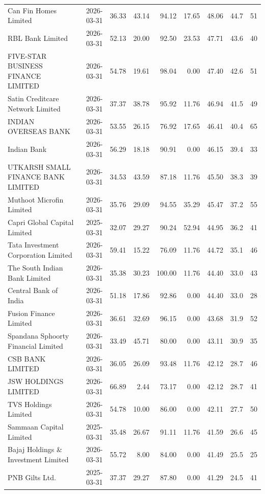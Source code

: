 {\begin{longtable}{@{}L{5.1cm}rrrrrrrr@{}}
Can Fin Homes Limited & 2026-03-31 & 36.33 & 43.14 & 94.12 & 17.65 & 48.06 & 44.7 & 51 \\
RBL Bank Limited & 2026-03-31 & 52.13 & 20.00 & 92.50 & 23.53 & 47.71 & 43.6 & 40 \\
FIVE-STAR BUSINESS FINANCE LIMITED & 2026-03-31 & 54.78 & 19.61 & 98.04 & 0.00 & 47.40 & 42.6 & 51 \\
Satin Creditcare Network Limited & 2026-03-31 & 37.37 & 38.78 & 95.92 & 11.76 & 46.94 & 41.5 & 49 \\
INDIAN OVERSEAS BANK & 2026-03-31 & 53.55 & 26.15 & 76.92 & 17.65 & 46.41 & 40.4 & 65 \\
Indian Bank & 2026-03-31 & 56.29 & 18.18 & 90.91 & 0.00 & 46.15 & 39.4 & 33 \\
UTKARSH SMALL FINANCE BANK LIMITED & 2026-03-31 & 34.53 & 43.59 & 87.18 & 11.76 & 45.50 & 38.3 & 39 \\
Muthoot Microfin Limited & 2026-03-31 & 35.76 & 29.09 & 94.55 & 35.29 & 45.47 & 37.2 & 55 \\
Capri Global Capital Limited & 2025-03-31 & 32.07 & 29.27 & 90.24 & 52.94 & 44.95 & 36.2 & 41 \\
Tata Investment Corporation Limited & 2026-03-31 & 59.41 & 15.22 & 76.09 & 11.76 & 44.72 & 35.1 & 46 \\
The South Indian Bank Limited & 2026-03-31 & 35.38 & 30.23 & 100.00 & 11.76 & 44.40 & 33.0 & 43 \\
Central Bank of India & 2026-03-31 & 51.18 & 17.86 & 92.86 & 0.00 & 44.40 & 33.0 & 28 \\
Fusion Finance Limited & 2026-03-31 & 36.61 & 32.69 & 96.15 & 0.00 & 43.68 & 31.9 & 52 \\
Spandana Sphoorty Financial Limited & 2026-03-31 & 33.49 & 45.71 & 80.00 & 0.00 & 43.11 & 30.9 & 35 \\
CSB BANK LIMITED & 2026-03-31 & 36.05 & 26.09 & 93.48 & 11.76 & 42.12 & 28.7 & 46 \\
JSW HOLDINGS LIMITED & 2026-03-31 & 66.89 & 2.44 & 73.17 & 0.00 & 42.12 & 28.7 & 41 \\
TVS Holdings Limited & 2026-03-31 & 54.78 & 10.00 & 86.00 & 0.00 & 42.11 & 27.7 & 50 \\
Sammaan Capital Limited & 2025-03-31 & 35.48 & 26.67 & 91.11 & 11.76 & 41.59 & 26.6 & 45 \\
Bajaj Holdings \& Investment Limited & 2026-03-31 & 55.72 & 8.00 & 84.00 & 0.00 & 41.49 & 25.5 & 25 \\
PNB Gilts Ltd. & 2025-03-31 & 37.37 & 29.27 & 87.80 & 0.00 & 41.29 & 24.5 & 41 \\

\end{longtable}}
